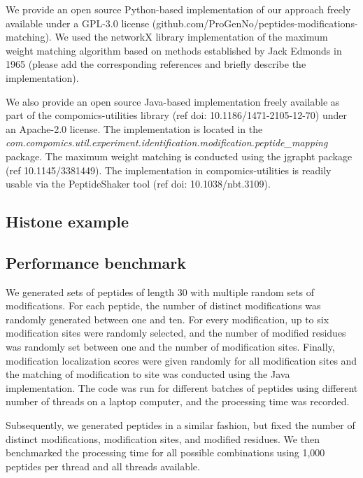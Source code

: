 \documentclass{bioinfo}
\begin{document}
\begin{methods}
We provide an open source Python-based implementation of our approach freely available under a GPL-3.0 license (github.com/ProGenNo/peptides-modifications-matching). We used the networkX library implementation of the maximum weight matching algorithm based on methods established by Jack Edmonds in 1965 \alert{(please add the corresponding references and briefly describe the implementation)}.

We also provide an open source Java-based implementation freely available as part of the compomics-utilities library (ref doi: 10.1186/1471-2105-12-70) under an Apache-2.0 license. The implementation is located in the \textit{com.compomics.util.experiment.identification.modification.peptide\_mapping} package. The maximum weight matching is conducted using the jgrapht package (ref 10.1145/3381449). The implementation in compomics-utilities is readily usable via the PeptideShaker tool (ref doi: 10.1038/nbt.3109).


\subsection{Histone example}


\subsection{Performance benchmark}

We generated sets of peptides of length 30 with multiple random sets of modifications. For each peptide, the number of distinct modifications was randomly generated between one and ten. For every modification, up to six modification sites were randomly selected, and the number of modified residues was randomly set between one and the number of modification sites. Finally, modification localization scores were given randomly for all modification sites and the matching of modification to site was conducted using the Java implementation. The code was run for different batches of peptides using different number of threads on a laptop computer, and the processing time was recorded. 

Subsequently, we generated peptides in a similar fashion, but fixed the number of distinct modifications, modification sites, and modified residues. We then benchmarked the processing time for all possible combinations using 1,000 peptides per thread and all threads available.


\end{methods}
\end{document}
